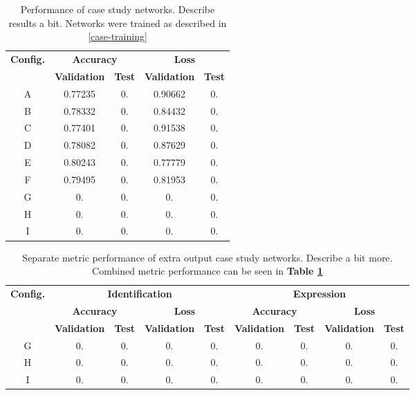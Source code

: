 \begin{table}[h!]
\begin{center}
\begin{tabular}{|c|c|c|c|c|}
\hline
\multirow{2}{*}{\textbf{Config.}} & \multicolumn{2}{|c|}{\textbf{Accuracy}} & \multicolumn{2}{|c|}{\textbf{Loss}} \\ \cline{2-5}
 & \textbf{Validation} & \textbf{Test} & \textbf{Validation} & \textbf{Test} \\ \hline
A & 0.77235 & 0. & 0.90662 & 0. \\ \hline
B & 0.78332 & 0. & 0.84432 & 0. \\ \hline
C & 0.77401 & 0. & 0.91538 & 0. \\ \hline
D & 0.78082 & 0. & 0.87629 & 0. \\ \hline
E & 0.80243 & 0. & 0.77779 & 0. \\ \hline
F & 0.79495 & 0. & 0.81953 & 0. \\ \hline
G & 0. & 0. & 0. & 0. \\ \hline
H & 0. & 0. & 0. & 0. \\ \hline
I & 0. & 0. & 0. & 0. \\ \hline
\end{tabular}
\end{center}
\caption[Performance of case study networks]{Performance of case study networks. Describe results a bit. Networks were trained as described in \ref{case-training}}
\label{tab:case-results}
\end{table}


\begin{table}[h!]
\begin{center}
\begin{tabular}{|c|c|c|c|c|c|c|c|c|}
\hline
\multirow{3}{*}{\textbf{Config.}} & \multicolumn{4}{|c|}{\textbf{Identification}} & \multicolumn{4}{|c|}{\textbf{Expression}} \\ \cline{2-9}
& \multicolumn{2}{|c|}{\textbf{Accuracy}} & \multicolumn{2}{|c|}{\textbf{Loss}} & \multicolumn{2}{|c|}{\textbf{Accuracy}} & \multicolumn{2}{|c|}{\textbf{Loss}} \\ \cline{2-9}
& \textbf{Validation} & \textbf{Test} & \textbf{Validation} & \textbf{Test} & \textbf{Validation} & \textbf{Test} & \textbf{Validation} & \textbf{Test} \\ \hline
G & 0. & 0. & 0. & 0. & 0. & 0. & 0. & 0. \\ \hline
H & 0. & 0. & 0. & 0. & 0. & 0. & 0. & 0. \\ \hline
I & 0. & 0. & 0. & 0. & 0. & 0. & 0. & 0. \\ \hline
\end{tabular}
\end{center}
\caption[Separate metric performance of extra output case study networks]{Separate metric performance of extra output case study networks. Describe a bit more. Combined metric performance can be seen in \textbf{Table \ref{tab:case-results}}}
\label{tab:case-sep-results}
\end{table}

